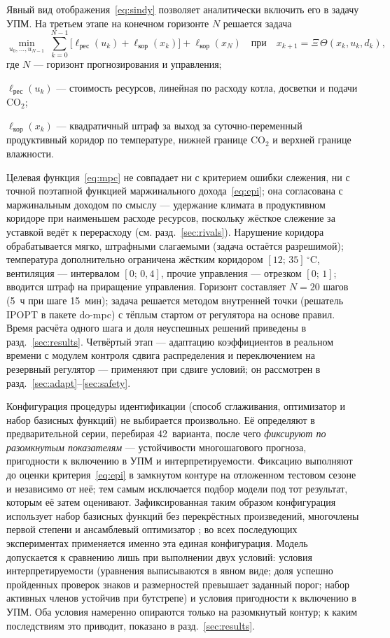\documentclass[12pt,a4paper,leqno]{article}
\begin{document}
Явный вид отображения~\eqref{eq:sindy} позволяет аналитически включить его в задачу УПМ.
На третьем этапе на конечном горизонте $N$ решается задача
\begin{equation}
\min_{u_{0},\dots,u_{N-1}}\ \sum_{k=0}^{N-1}\bigl[\ell_{\text{рес}}(u_k)+\ell_{\text{кор}}(x_k)\bigr]
+\ell_{\text{кор}}(x_N)\quad\text{при}\quad x_{k+1}=\Xi\,\Theta(x_k,u_k,d_k),
\label{eq:mpc}
\end{equation}
где $N$ — горизонт прогнозирования и управления;\par
\noindent $\ell_{\text{рес}}(u_k)$ — стоимость ресурсов, линейная по расходу котла,
досветки и подачи CO$_2$;\par
\noindent $\ell_{\text{кор}}(x_k)$ — квадратичный штраф за выход за суточно-переменный
продуктивный коридор по температуре, нижней границе CO$_2$ и верхней границе влажности.\par
Целевая функция~\eqref{eq:mpc} не совпадает ни с критерием ошибки слежения, ни с точной
поэтапной функцией маржинального дохода~\eqref{eq:epi}; она согласована с маржинальным доходом по смыслу — удержание
климата в продуктивном коридоре при наименьшем расходе ресурсов, поскольку жёсткое
слежение за уставкой ведёт к перерасходу (см. разд.~\ref{sec:rivals}). Нарушение
коридора обрабатывается мягко, штрафными слагаемыми (задача остаётся разрешимой);
температура дополнительно ограничена жёстким коридором $[12;\,35]\,^\circ$C, вентиляция —
интервалом $[0;\,0{,}4]$, прочие управления — отрезком $[0;\,1]$; вводится штраф на
приращение управления. Горизонт составляет $N=20$ шагов (5~ч при шаге 15~мин); задача
решается методом внутренней точки (решатель IPOPT в пакете do-mpc) с тёплым стартом от
регулятора на основе правил. Время расчёта одного шага и доля неуспешных решений
приведены в разд.~\ref{sec:results}. Четвёртый этап — адаптацию коэффициентов в реальном
времени с модулем контроля сдвига распределения и переключением на
резервный регулятор — применяют при сдвиге условий; он рассмотрен в
разд.~\ref{sec:adapt}--\ref{sec:safety}.

Конфигурация процедуры идентификации (способ сглаживания, оптимизатор и набор базисных
функций) не выбирается произвольно. Её определяют в предварительной серии, перебирая
42~варианта, после чего \emph{фиксируют по разомкнутым показателям} — устойчивости
многошагового прогноза, пригодности к включению в УПМ и интерпретируемости. Фиксацию
выполняют до оценки критерия~\eqref{eq:epi} в замкнутом контуре на отложенном тестовом
сезоне и независимо от неё; тем самым исключается подбор модели под тот результат,
которым её затем оценивают. Зафиксированная таким
образом конфигурация использует набор базисных функций без перекрёстных произведений,
многочлены первой степени и ансамблевый оптимизатор \cite{fasel2022}; во всех
последующих экспериментах применяется именно эта единая конфигурация. Модель
допускается к сравнению лишь при выполнении двух условий: условия интерпретируемости
(уравнения выписываются в явном виде; доля успешно пройденных проверок знаков и
размерностей превышает заданный порог; набор активных членов устойчив при бутстрепе) и
условия пригодности к включению в УПМ. Оба условия намеренно опираются только на
разомкнутый контур; к каким последствиям это приводит, показано в
разд.~\ref{sec:results}.
\end{document}
